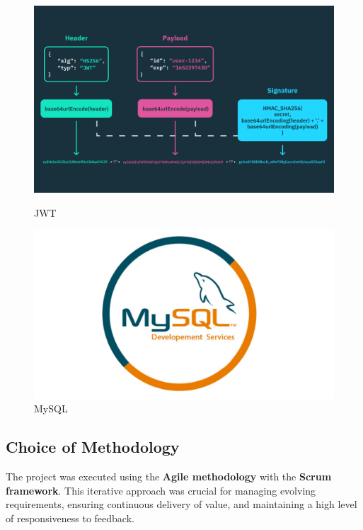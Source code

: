 \begin{figure}[H]
    \begin{minipage}{0.45\textwidth}
        \centering
        \includegraphics[width=\linewidth]{chapters/chapter 1/figures/jwt-struct.png}
        \caption{JWT}
        \label{fig:jwt}
    \end{minipage}%
    \hfill
    \begin{minipage}{0.45\textwidth}
        \centering
        \includegraphics[width=\linewidth]{chapters/chapter 1/figures/mysql.png}
        \caption{MySQL}
        \label{fig:mysql}
    \end{minipage}
\end{figure}

\subsection{Choice of Methodology}
The project was executed using the \textbf{Agile methodology} with the \textbf{Scrum framework}. This iterative approach was crucial for managing evolving requirements, ensuring continuous delivery of value, and maintaining a high level of responsiveness to feedback.

